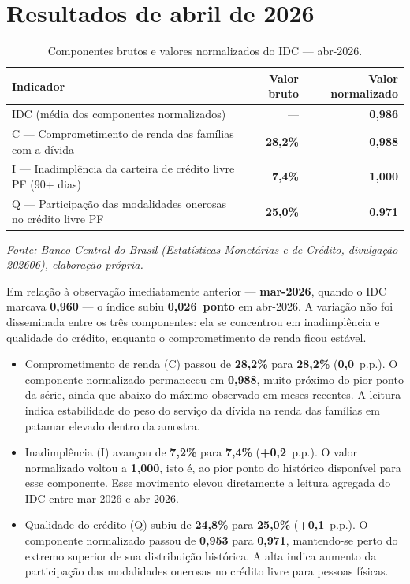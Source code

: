 \documentclass[11pt,a4paper]{article}
\newcommand{\fonte}[1]{%
  \par\vspace{0.2\baselineskip}%
  \small\textit{Fonte: #1}\par\vspace{0.8\baselineskip}%
}
\newcommand{\mesreferencia}{abril de 2026}                          %
\newcommand{\mesref}{abr-2026}                                      %
\newcommand{\mesanterior}{mar-2026}                                 %
\newcommand{\competencia}{202606}                                   %
\begin{document}
\section{Resultados de \mesreferencia}

\begin{table}[htbp]
  \centering
  \caption{Componentes brutos e valores normalizados do IDC --- \mesref.}
  \label{tab:componentes}
  \begin{tabular}{p{8.0cm}rr}
    \toprule
    Indicador & Valor bruto & Valor normalizado \\
    \midrule
    IDC (média dos componentes normalizados)
      & ---
      & \textbf{0,986} \\
    C --- Comprometimento de renda das famílias com a dívida
      & \textbf{28,2\%}
      & \textbf{0,988} \\
    I --- Inadimplência da carteira de crédito livre PF (90+ dias)
      & \textbf{7,4\%}
      & \textbf{1,000} \\
    Q --- Participação das modalidades onerosas no crédito livre PF
      & \textbf{25,0\%}
      & \textbf{0,971} \\
    \bottomrule
  \end{tabular}
  \fonte{Banco Central do Brasil (Estatísticas Monetárias e de Crédito,
  divulgação \competencia), elaboração própria.}
\end{table}

Em relação à observação imediatamente anterior --- \textbf{\mesanterior}, quando o IDC
marcava \textbf{0,960} --- o índice subiu
\textbf{0,026~ponto} em \mesref.
A variação não foi disseminada entre os três componentes: ela se concentrou em
inadimplência e qualidade do crédito, enquanto o comprometimento de renda ficou estável.

\begin{itemize}
  \item Comprometimento de renda (C) passou de \textbf{28,2\%} para
    \textbf{28,2\%} (\textbf{0,0}~p.p.).
    O componente normalizado permaneceu em \textbf{0,988}, muito próximo do pior
    ponto da série, ainda que abaixo do máximo observado em meses recentes. A leitura
    indica estabilidade do peso do serviço da dívida na renda das famílias em patamar
    elevado dentro da amostra.

  \item Inadimplência (I) avançou de
    \textbf{7,2\%} para \textbf{7,4\%}
    (\textbf{+0,2}~p.p.).
    O valor normalizado voltou a \textbf{1,000}, isto é, ao pior ponto do histórico
    disponível para esse componente. Esse movimento elevou diretamente a leitura
    agregada do IDC entre \mesanterior{} e \mesref.

  \item Qualidade do crédito (Q) subiu de
    \textbf{24,8\%} para \textbf{25,0\%}
    (\textbf{+0,1}~p.p.).
    O componente normalizado passou de \textbf{0,953} para \textbf{0,971}, mantendo-se
    perto do extremo superior de sua distribuição histórica. A alta indica aumento da
    participação das modalidades onerosas no crédito livre para pessoas físicas.
\end{itemize}
\end{document}
